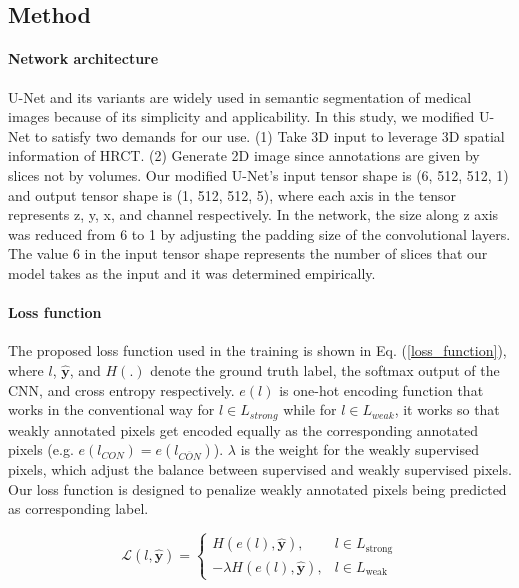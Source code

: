 \documentclass[]{spie}
\begin{document}



\subsection{Method}
\paragraph{Network architecture}
U-Net\cite{Ronneberger2015} and its variants are widely used in semantic segmentation of medical images because of its simplicity and applicability.
In this study, we modified U-Net to satisfy two demands for our use.
(1) Take 3D input to leverage 3D spatial information of HRCT.
(2) Generate 2D image since annotations are given by slices not by volumes.
Our modified U-Net's input tensor shape is (6, 512, 512, 1) and output tensor shape is (1, 512, 512, 5), where each axis in the tensor represents z, y, x, and channel respectively.
In the network, the size along z axis was reduced from 6 to 1 by adjusting the padding size of the convolutional layers.
The value 6 in the input tensor shape represents the number of slices that our model takes as the input and it was determined empirically.

\paragraph{Loss function}
\def\vyhat{\mathbf{\hat{y}}} %
The proposed loss function used in the training is shown in Eq. (\ref{loss_function}), where $l$, $\vyhat$, and $H(.)$ denote the ground truth label, the softmax output of the CNN, and cross entropy respectively.
$e(l)$ is one-hot encoding function that works in the conventional way for $l\in L_{strong}$ while for $l\in L_{weak}$, it works so that weakly annotated pixels get encoded equally as the corresponding annotated pixels (e.g. $e(l_{CON}) = e(l_{\overline{CON}})$).
$\lambda$ is the weight for the weakly supervised pixels, which adjust the balance between supervised and weakly supervised pixels.
Our loss function is designed to penalize weakly annotated pixels being predicted as corresponding label.

\begin{equation}
  \mathcal{L}(l,\vyhat)=
  \begin{cases}
    H(e(l),\vyhat), & l \in L_{\text{strong}} \\
    -\lambda H(e(l),\vyhat), & l \in L_{\text{weak}}
  \end{cases}
  \label{loss_function}
\end{equation}
\end{document}
